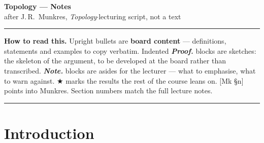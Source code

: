 \documentclass[12pt,a4paper]{article}
\newcommand{\Mk}[1]{{\footnotesize\textcolor{cue}{[Mk #1]}}}  %
\begin{document}
\begin{center}
{\LARGE\bfseries\color{hdr} Topology --- Notes}\\[3pt]
{\normalsize after J.\,R.\ Munkres, \emph{Topology}\quad$\cdot$\quad lecturing script, not a text}
\end{center}
\vspace{2pt}
\hrule
\vspace{4pt}

{\small
\textbf{How to read this.}\quad
Upright bullets are \textbf{board content} --- definitions, statements and examples to copy
verbatim.
Indented \textbf{\textit{Proof.}} blocks are sketches: the skeleton of the argument, to be
developed at the board rather than transcribed.
\textbf{\textit{Note.}} blocks are asides for the lecturer --- what to emphasise, what to warn
against.
$\bigstar$ marks the results the rest of the course leans on.
\Mk{\S n} points into Munkres.
Section numbers match the full lecture notes.
}

\vspace{4pt}
\hrule
\vspace{6pt}

\section*{Introduction}
\vspace{-16pt}{\color{hdr}\rule{\textwidth}{0.7pt}}
\end{document}
